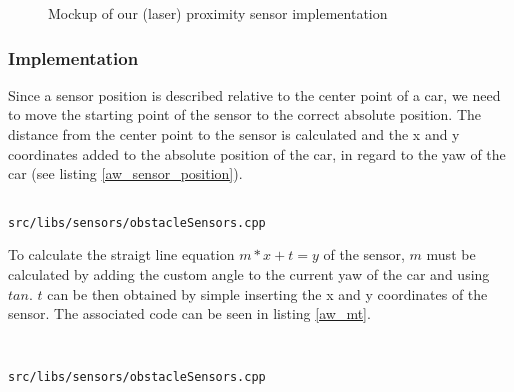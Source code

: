 \documentclass[paper=a4, fontsize=11pt]{scrreprt}
\begin{document}
\begin{figure}[ht]
  \begin{center}
    \caption{Mockup of our (laser) proximity sensor implementation}\label{aw_mockup}
  \end{center}
\end{figure}

\subsubsection{Implementation}

Since a sensor position is described relative to the center point of a car,
we need to move the starting point of the sensor to the correct absolute position.
The distance from the center point to the sensor is calculated
and the x and y coordinates added to the absolute position of the car,
in regard to the yaw of the car (see listing \ref{aw_sensor_position}).

\begin{listing}[ht]
  \inputminted[firstline=91,linenos=true,lastline=96,gobble=2]{c++}{../../../simulators/speed-dreams/src/libs/sensors/obstacleSensors.cpp}
  \caption{\texttt{src/libs/sensors/obstacleSensors.cpp}}\label{aw_sensor_position}
\end{listing}

To calculate the straigt line equation $m*x+t=y$ of the sensor,
$m$ must be calculated by adding the custom angle to the current yaw of the car
and using $tan$. $t$ can be then obtained by simple inserting the x and y coordinates of the sensor.
The associated code can be seen in listing \ref{aw_mt}.

\begin{listing}[ht]
  \inputminted[firstline=105,linenos=true,lastline=104,gobble=2]{c++}{../../../simulators/speed-dreams/src/libs/sensors/obstacleSensors.cpp}
  \inputminted[firstline=110,linenos=true,lastline=109,gobble=2]{c++}{../../../simulators/speed-dreams/src/libs/sensors/obstacleSensors.cpp}
  \caption{\texttt{src/libs/sensors/obstacleSensors.cpp}}\label{aw_mt}
\end{listing}
\end{document}
